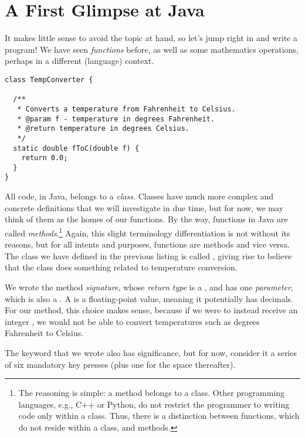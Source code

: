 \section{A First Glimpse at Java}

It makes little sense to avoid the topic at hand, so let's jump right in and write a program! 
We have seen \emph{functions} before, as well as some mathematics operations, perhaps in a different (language) context. 


\begin{lstlisting}[language=MyJava]
class TempConverter {
  
  /**
   * Converts a temperature from Fahrenheit to Celsius.
   * @param f - temperature in degrees Fahrenheit.
   * @return temperature in degrees Celsius.
   */
  static double fToC(double f) {
    return 0.0;
  }
}
\end{lstlisting}

All code, in Java, belongs to a \emph{class}. 
Classes have much more complex and concrete definitions that we will investigate in due time, but for now, we may think of them as the homes of our functions. 
By the way, functions in Java are called \emph{methods}.\footnote{The reasoning is simple: a method belongs to a class. Other programming languages, e.g., C++ or Python, do not restrict the programmer to writing code only within a class. Thus, there is a distinction between functions, which do not reside within a class, and methods.} 
Again, this slight terminology differentiation is not without its reasons, but for all intents and purposes, functions are methods and vice versa. 
The class we have defined in the previous listing is called , giving rise to believe that the class does something related to temperature conversion.

We wrote the  method \emph{signature}, whose \emph{return type} is a , and has one \emph{parameter}, which is also a . 
A  is a floating-point value, meaning it potentially has decimals. 
For our method, this choice makes sense, because if we were to instead receive an integer , we would not be able to convert temperatures such as  degrees Fahrenheit to Celsius. 

The  keyword that we wrote also has significance, but for now, consider it a series of six mandatory key presses (plus one for the space thereafter).

